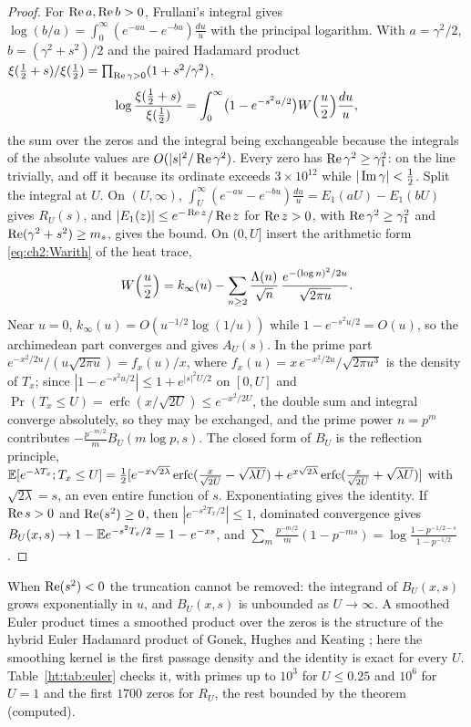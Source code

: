 \begin{proof}
For $\operatorname{Re} a,\operatorname{Re} b>0$, Frullani's integral gives $\log(b/a)=\int_0^\infty(e^{-au}-e^{-bu})\frac{du}u$ with the principal logarithm. With $a=\gamma^2/2$, $b=(\gamma^2+s^2)/2$ and the paired Hadamard product $\xi(\frac12+s)/\xi(\frac12)=\prod_{\operatorname{Re}\gamma>0}(1+s^2/\gamma^2)$,
\[
\log\frac{\xi(\frac12+s)}{\xi(\frac12)}=\int_0^\infty\bigl(1-e^{-s^2u/2}\bigr)W\Bigl(\frac u2\Bigr)\frac{du}u,
\]
the sum over the zeros and the integral being exchangeable because the integrals of the absolute values are $O(|s|^2/\operatorname{Re}\gamma^2)$. Every zero has $\operatorname{Re}\gamma^2\ge\gamma_1^2$: on the line trivially, and off it because its ordinate exceeds $3\times10^{12}$ \cite{PT21} while $|\operatorname{Im}\gamma|<\frac12$. Split the integral at $U$. On $(U,\infty)$, $\int_U^\infty(e^{-au}-e^{-bu})\frac{du}u=E_1(aU)-E_1(bU)$ gives $R_U(s)$, and $|E_1(z)|\le e^{-\operatorname{Re} z}/\operatorname{Re} z$ for $\operatorname{Re} z>0$, with $\operatorname{Re}\gamma^2\ge\gamma_1^2$ and $\operatorname{Re}(\gamma^2+s^2)\ge m_s$, gives the bound. On $(0,U]$ insert the arithmetic form \eqref{eq:ch2:Warith} of the heat trace,
\[
W\Bigl(\frac u2\Bigr)=k_\infty(u)-\sum_{n\ge2}\frac{\Lambda(n)}{\sqrt n}\,\frac{e^{-(\log n)^2/2u}}{\sqrt{2\pi u}} .
\]
Near $u=0$, $k_\infty(u)=O(u^{-1/2}\log(1/u))$ while $1-e^{-s^2u/2}=O(u)$, so the archimedean part converges and gives $A_U(s)$. In the prime part $e^{-x^2/2u}/(u\sqrt{2\pi u})=f_x(u)/x$, where $f_x(u)=x\,e^{-x^2/2u}/\sqrt{2\pi u^3}$ is the density of $T_x$; since $|1-e^{-s^2u/2}|\le1+e^{|s|^2U/2}$ on $[0,U]$ and $\Pr(T_x\le U)=\operatorname{erfc}(x/\sqrt{2U})\le e^{-x^2/2U}$, the double sum and integral converge absolutely, so they may be exchanged, and the prime power $n=p^m$ contributes $-\frac{p^{-m/2}}mB_U(m\log p,s)$. The closed form of $B_U$ is the reflection principle, $\mathbb{E}[e^{-\lambda T_x};T_x\le U]=\frac12[e^{-x\sqrt{2\lambda}}\operatorname{erfc}(\frac x{\sqrt{2U}}-\sqrt{\lambda U})+e^{x\sqrt{2\lambda}}\operatorname{erfc}(\frac x{\sqrt{2U}}+\sqrt{\lambda U})]$ with $\sqrt{2\lambda}=s$, an even entire function of $s$. Exponentiating gives the identity. If $\operatorname{Re} s>0$ and $\operatorname{Re}(s^2)\ge0$, then $|e^{-s^2T_x/2}|\le1$, dominated convergence gives $B_U(x,s)\to1-\mathbb{E} e^{-s^2T_x/2}=1-e^{-xs}$, and $\sum_m\frac{p^{-m/2}}m(1-p^{-ms})=\log\frac{1-p^{-1/2-s}}{1-p^{-1/2}}$.
\end{proof}

When $\operatorname{Re}(s^2)<0$ the truncation cannot be removed: the integrand of $B_U(x,s)$ grows exponentially in $u$, and $B_U(x,s)$ is unbounded as $U\to\infty$. A smoothed Euler product times a smoothed product over the zeros is the structure of the hybrid Euler Hadamard product of Gonek, Hughes and Keating \cite{GHK07}; here the smoothing kernel is the first passage density and the identity is exact for every $U$. Table~\ref{ht:tab:euler} checks it, with primes up to $10^3$ for $U\le0.25$ and $10^6$ for $U=1$ and the first $1700$ zeros for $R_U$, the rest bounded by the theorem (computed).

